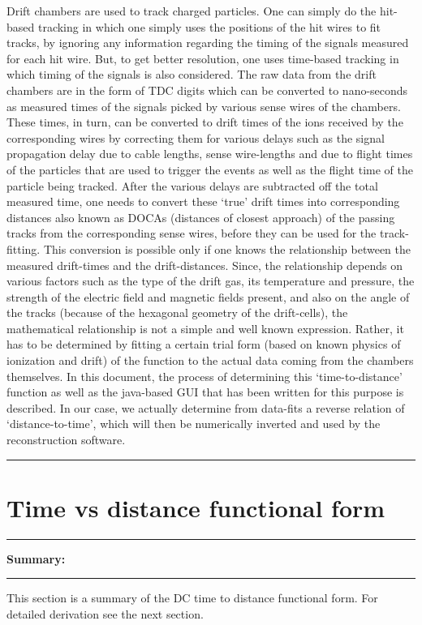\documentclass[12pt]{article}
\begin{document}
Drift chambers are used to track charged particles. One can simply do the hit-based tracking in which one simply uses the positions of the hit wires to fit tracks, by ignoring any information regarding the timing of the signals measured for each hit wire. But, to get better resolution, one uses time-based tracking in which timing of the signals is also considered. The raw data from the drift chambers are in the form of TDC digits which can be converted to nano-seconds as measured times of the signals picked by various sense wires of the chambers. These times, in turn, can be converted to drift times of the ions received by the corresponding wires by correcting them for various delays such as the signal propagation delay due to cable lengths, sense wire-lengths and due to flight times of the particles that are used to trigger the events as well as the flight time of the particle being tracked. After the various delays are subtracted off the total measured time, one needs to convert these `true' drift times into corresponding distances also known as DOCAs (distances of closest approach) of the passing tracks from the corresponding sense wires, before they can be used for the track-fitting. This conversion is possible only if one knows the relationship between the measured drift-times and the drift-distances. Since, the relationship depends on various factors such as the type of the drift gas, its temperature and pressure, the strength of the electric field and magnetic fields present, and also on the angle of the tracks (because of the hexagonal geometry of the drift-cells), the mathematical relationship is not a simple and well known expression. Rather, it has to be determined by fitting a certain trial form (based on known physics of ionization and drift) of the function to the actual data coming from the chambers themselves. In this document, the process of determining this `time-to-distance' function as well as the java-based GUI that has been written for this purpose is described. In our case, we actually determine from data-fits a reverse relation of `distance-to-time', which will then be numerically inverted and used by the reconstruction software.

\newpage
{\color{black} \rule{\linewidth}{0.75mm} }
\section{Time vs distance functional form }
{\color{black} \rule{\linewidth}{0.75mm} }

\textbf{Summary:}\\
{\color{black} \rule{\linewidth}{0.5mm} }
This section is a summary of the DC time to distance functional form. For detailed derivation see the next section.  
  
\end{document}
